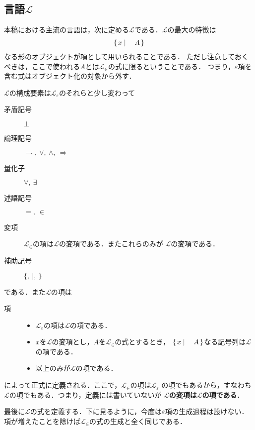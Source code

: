 \subsection{言語$\mathcal{L}$}
	本稿における主流の言語は，次に定める$\mathcal{L}$である．$\mathcal{L}$の最大の特徴は
	\begin{align}
		\left\{\, x \mid \quad A\, \right\}
	\end{align}
	なる形のオブジェクトが項として用いられることである．
	ただし注意しておくべきは，ここで使われる$A$とは$\mathcal{L}_{\in}$の式に限るということである．
	つまり，$\varepsilon$項を含む式はオブジェクト化の対象から外す．
	
	$\mathcal{L}$の構成要素は$\mathcal{L}_{\varepsilon}$のそれらと少し変わって
	
	\begin{description}
		\item[矛盾記号] $\bot$
		\item[論理記号] $\rightharpoondown,\ \vee,\ \wedge,\ \Longrightarrow$
		\item[量化子] $\forall,\ \exists$
		\item[述語記号] $=,\ \in$
		\item[変項] $\mathcal{L}_{\in}$の項は$\mathcal{L}$の変項である．またこれらのみが
			$\mathcal{L}$の変項である．
		\item[補助記号] $\{,\ |,\ \}$
	\end{description}
	
	である．また$\mathcal{L}$の項は
	
	\begin{description}
		\item[項] 
			\begin{itemize}
				\item $\mathcal{L}_{\varepsilon}$の項は$\mathcal{L}$の項である．
				\item $x$を$\mathcal{L}$の変項とし，$A$を$\mathcal{L}_{\in}$の式とするとき，
					$\left\{\, x \mid \quad A\, \right\}$なる記号列は$\mathcal{L}$の項である．
				\item 以上のみが$\mathcal{L}$の項である．
			\end{itemize}
	\end{description}
	
	によって正式に定義される．ここで，$\mathcal{L}_{\in}$の項は$\mathcal{L}_{\varepsilon}$
	の項でもあるから，すなわち$\mathcal{L}$の項でもある．つまり，定義には書いていないが
	{\bf $\mathcal{L}$の変項は$\mathcal{L}$の項である}．
	
	最後に$\mathcal{L}$の式を定義する．下に見るように，今度は$\varepsilon$項の生成過程は設けない．
	項が増えたことを除けば$\mathcal{L}_{\in}$の式の生成と全く同じである．
	
